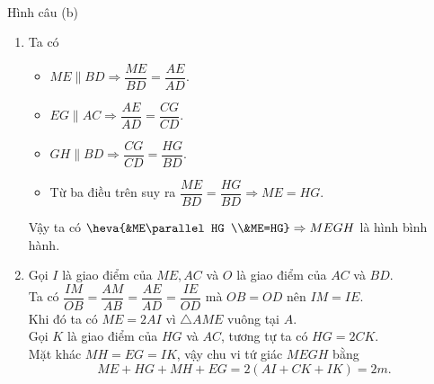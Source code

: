 \begin{vd}
{\begin{minipage}{0.5\textwidth}
\begin{center}
\\Hình câu (b)		
\end{center}
\end{minipage}
\begin{enumerate}
	\item Ta có
	\begin{itemize}
		\item $ME \parallel BD \Rightarrow \dfrac{ME}{BD}=\dfrac{AE}{AD}$.
		\item $EG \parallel AC \Rightarrow \dfrac{AE}{AD}=\dfrac{CG}{CD}$.
		\item $GH \parallel BD \Rightarrow \dfrac{CG}{CD}=\dfrac{HG}{BD}$.
		\item Từ ba điều trên suy ra $\dfrac{ME}{BD}=\dfrac{HG}{BD} \Rightarrow ME=HG$.
	\end{itemize}
	Vậy ta có $\heva{&ME\parallel HG \\&ME=HG}\Rightarrow MEGH$ là hình bình hành.
	\item Gọi $I$ là giao điểm của $ ME,AC $ và $O$ là giao điểm của $AC$ và $BD$.\\
	Ta có $\dfrac{IM}{OB}=\dfrac{AM}{AB}=\dfrac{AE}{AD}=\dfrac{IE}{OD}$ mà $OB=OD$ nên $IM=IE$.\\
	Khi đó ta có $ME=2AI$ vì $\triangle AME$ vuông tại $A$.\\
	Gọi $K$ là giao điểm của $HG$ và $AC$, tương tự ta có $HG=2CK$. \\
	Mặt khác $ MH=EG=IK $, vậy chu vi tứ giác $ MEGH $ bằng
	$$ ME+HG+MH+EG=2(AI+CK+IK)=2m. $$
\end{enumerate}
}
\end{vd}

